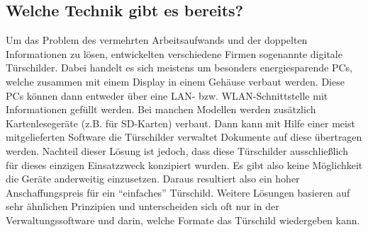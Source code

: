 \begin{flushleft}
\section{Welche Technik gibt es bereits?}
Um das Problem des vermehrten Arbeitsaufwands und der doppelten Informationen zu lösen, entwickelten verschiedene Firmen sogenannte digitale Türschilder. Dabei handelt es sich meistens um besonders energiesparende PCs, welche zusammen mit einem Display in einem Gehäuse verbaut werden. Diese PCs können dann entweder über eine LAN- bzw. WLAN-Schnittstelle mit Informationen gefüllt werden. Bei manchen Modellen werden zusätzlich Kartenlesegeräte (z.B. für SD-Karten) verbaut. Dann kann mit Hilfe einer meist mitgelieferten Software die Türschilder verwaltet Dokumente auf diese übertragen werden. 
Nachteil dieser Lösung ist jedoch, dass diese Türschilder ausschließlich für dieses einzigen Einsatzzweck konzipiert wurden. Es gibt also keine Möglichkeit die Geräte anderweitig einzusetzen. Daraus resultiert also ein hoher Anschaffungspreis für ein ``einfaches'' Türschild. 
Weitere Lösungen basieren auf sehr ähnlichen Prinzipien und unterscheiden sich oft nur in der Verwaltungssoftware und darin, welche Formate das Türschild wiedergeben kann. 
\end{flushleft}


